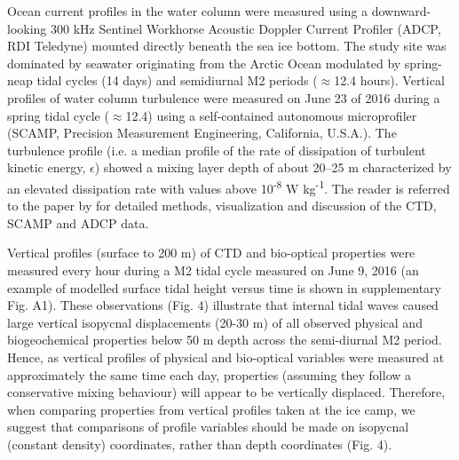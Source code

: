\documentclass[essd, manuscript]{copernicus}
\begin{document}
Ocean current profiles in the water column were measured using a downward-looking 300 kHz Sentinel Workhorse Acoustic Doppler Current Profiler (ADCP, RDI Teledyne) mounted directly beneath the sea ice bottom. The study site was dominated by seawater originating from the Arctic Ocean modulated by spring-neap tidal cycles (14 days) and semidiurnal M2 periods ($\approx$12.4 hours). Vertical profiles of water column turbulence were measured on June 23 of 2016 during a spring tidal cycle ($\approx$12.4) using a self-contained autonomous microprofiler (SCAMP, Precision Measurement Engineering, California, U.S.A.). The turbulence profile (i.e. a median profile of the rate of dissipation of turbulent kinetic energy, $\epsilon$) showed a mixing layer depth of about 20–25 m characterized by an elevated dissipation rate with values above 10\textsuperscript{-8} W kg\textsuperscript{-1}. The reader is referred to the paper by \citet{Oziel2019} for detailed methods, visualization and discussion of the CTD, SCAMP and ADCP data. 

Vertical profiles (surface to 200 m) of CTD and bio-optical properties were measured every hour during a M2 tidal cycle measured on June 9, 2016 (an example of modelled surface tidal height versus time is shown in supplementary Fig. A1). These observations (Fig. 4) illustrate that internal tidal waves caused large vertical isopycnal displacements (20-30 m) of all observed physical and biogeochemical properties below 50 m depth across the semi-diurnal M2 period. Hence, as vertical profiles of physical and bio-optical variables were measured at approximately the same time each day, properties (assuming they follow a conservative mixing behaviour) will appear to be vertically displaced. Therefore, when comparing properties from vertical profiles taken at the ice camp, we suggest that comparisons of profile variables should be made on isopycnal (constant density) coordinates, rather than depth coordinates (Fig. 4).
\end{document}
